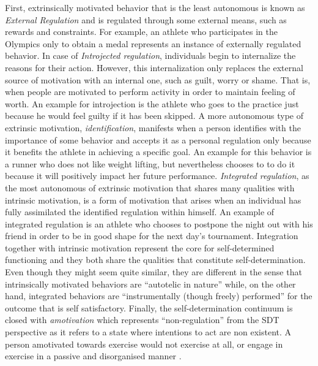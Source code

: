 First, extrinsically motivated behavior that is the least autonomous is known as \textit{External Regulation} and is regulated through some external means, such as rewards and constraints. For example, an athlete who participates in the Olympics only to obtain a medal represents an instance of externally regulated behavior. In case of \textit{Introjected regulation}, individuals begin to internalize the reasons for their action. However, this internalization only replaces the external source of motivation with an internal one, such as guilt, worry or shame. That is, when people are motivated to perform activity in order to maintain feeling of worth. An example for introjection is the athlete who goes to the practice just because he would feel guilty if it has been skipped. A more autonomous type of extrinsic motivation, \textit{identification}, manifests when a person identifies with the importance of some behavior and accepts it as a personal regulation only because it benefits the athlete in achieving a specific goal. An example for this behavior is a runner who does not like weight lifting, but nevertheless chooses to to do it because it will positively impact her future performance. \textit{Integrated regulation}, as the most autonomous of extrinsic motivation that shares many qualities with intrinsic motivation, is a form of motivation that arises when an individual has fully assimilated the identified regulation within himself. An example of integrated regulation is an athlete who chooses to postpone the night out with his friend in order to be in good shape for the next day's tournament. Integration together with intrinsic motivation represent the core for self-determined functioning and they both share the qualities that constitute self-determination. Even though they might seem quite similar, they are different in the sense that intrinsically motivated behaviors are ``autotelic in nature'' while, on the other hand, integrated behaviors are ``instrumentally (though freely) performed'' for the outcome that is self satisfactory.  Finally, the self-determination continuum is closed with  \textit{amotivation} which represents ``non-regulation'' from the SDT perspective as it refers to a state where intentions to act are non existent. A person amotivated towards exercise would not exercise at all, 
or engage in exercise in a passive and disorganised  manner \cite{vallerand2007intrinsic, ryan2000intrinsic, deci1994promoting}.


